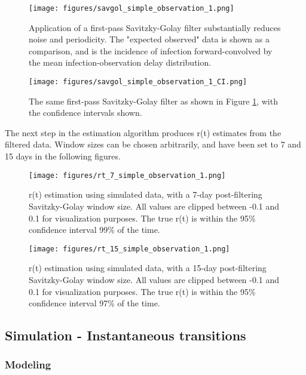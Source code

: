 \documentclass{article}
\begin{document}
\begin{figure}[h!]
\centering
\texttt{[image: figures/savgol\_simple\_observation\_1.png]}
\caption{Application of a first-pass Savitzky-Golay filter substantially reduces noise and periodicity. The "expected observed" data is shown as a comparison, and is the incidence of infection forward-convolved by the mean infection-observation delay distribution.}
\label{SGnoCI}
\end{figure}

\begin{figure}[h!]
\centering
\texttt{[image: figures/savgol\_simple\_observation\_1\_CI.png]}
\caption{The same first-pass Savitzky-Golay filter as shown in Figure \ref{SGnoCI}, with the confidence intervals shown.} 

\end{figure}

The next step in the estimation algorithm produces r(t) estimates from the filtered data. Window sizes can be chosen arbitrarily, and have been set to 7 and 15 days in the following figures.


\begin{figure}[h!]
\centering
\texttt{[image: figures/rt\_7\_simple\_observation\_1.png]}
\caption{r(t) estimation using simulated data, with a 7-day post-filtering Savitzky-Golay window size. All values are clipped between -0.1 and 0.1 for visualization purposes. The true r(t) is within the 95\% confidence interval 99\% of the time.}
\end{figure}

\clearpage
\begin{figure}[h!]
\centering
\texttt{[image: figures/rt\_15\_simple\_observation\_1.png]}
\caption{r(t) estimation using simulated data, with a 15-day post-filtering Savitzky-Golay window size. All values are clipped between -0.1 and 0.1 for visualization purposes. The true r(t) is within the 95\% confidence interval 97\% of the time.}
\end{figure}



\subsection{Simulation - Instantaneous transitions}
\subsubsection{Modeling}
\end{document}
